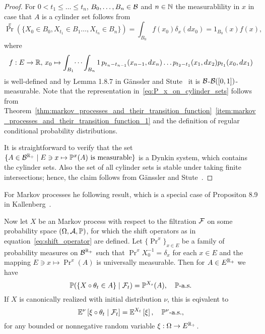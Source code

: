 \documentclass[../Master.tex]{subfiles}
\begin{document}
\begin{proof}
  For \(0 < t_1 \le \dots \le t_n\), \(B_0, \dots, B_n \in \mathcal{B}\) and \(n \in \mathbb{N}{}\) the measurablility in \(x\) in case that \(A\) is a cylinder set follows from
  \begin{equation}\label{eq:P_x_on_cylinder_sets}
    \Pr^x(\{X_0 \in B_0, X_{t_1} \in B_1 \dots, X_{t_n} \in B_n \}) = \int_{B_0} f(x_0) \delta_x(dx_0) = 1_{B_0}(x) f(x),
  \end{equation}
  where
  \begin{equation*}
    f: E \to \mathbb{R}, \, x_0 \mapsto \int_{B_1} \dots \int_{B_n} 1 \, p_{t_n - t_{n - 1}}(x_{n-1}, dx_n) \dots p_{t_2 - t_1}(x_1, dx_2) p_{t_1}(x_0, dx_1)
  \end{equation*}
  is well-defined and by Lemma 1.8.7 in Gänssler and Stute~\cite{ganssler_wahrscheinlichkeitstheorie_1977} it is \(\mathcal{B}\)-\(\mathcal{B}([0,1])\)-measurable. Note that the representation in~\eqref{eq:P_x_on_cylinder_sets} follows from Theorem~\ref{thm:markov_processes_and_their_transition_function}~\ref{item:markov_processes_and_their_transition_function_1} and the definition of regular conditional probability distributions.

  It is straightforward to verify that the set \( \{A \in \mathcal{B}^{\mathbb{R}_+} \mid E \ni x \mapsto \mathbb{P}^x(A) \text{ is measurable}\}{}\) is a Dynkin system, which contains the cylinder sets. Also the set of all cylinder sets is stable under taking finite intersections; hence, the claim follows from Gänssler and Stute~\cite*[Theorem 1.1.22]{ganssler_wahrscheinlichkeitstheorie_1977}.
\end{proof}



For Markov processes he following result, which is a special case of Propositon 8.9 in Kallenberg~\cite{kallenberg_foundations_2002}.

\begin{proposition}\label{prop:extended_Markov_property}
  Now let \(X\) be an Markov process with respect to the filtration \(\mathcal{F}\) on some probability space \((\Omega, \mathcal{A}, \mathbb{P}{})\), for which the shift operators as in equation~\eqref{eq:shift_operator} are defined. Let \({\{\Pr^x\}}_{x \in E}\) be a family of probability measures on \(\mathcal{B}^{\mathbb{R}_+}\) such that \(\Pr^x X_0^{-1} = \delta_x\) for each \(x \in E\) and the mapping \(E \ni x \mapsto \Pr^x(A)\) is universally measurable. Then for \(A \in E^{\mathbb{R}_+}\) we have
  \begin{equation}
    \mathbb{P}(\{X \circ \theta_t \in A\} \mid \mathcal{F}_t) = \mathbb{P}^{X_s} (A), \quad \mathbb{P} \text{-a.s.} 
  \end{equation}
  If \(X\) is canonically realized with initial distribution \(\nu{}\), this is eqivalent to
  \begin{equation}
    \mathbb{E}^{\nu{}} \left[ \xi \circ \theta_t \mid \mathcal{F}_t \right] = \mathbb{E}^{X_t} \left[ \xi \right], \quad \mathbb{P}^{\nu{}} \text{-a.s.},
  \end{equation}
for any bounded or nonnegative random variable \(\xi: \Omega \to E^{\mathbb{R}_+}\).
\end{proposition}
\end{document}
